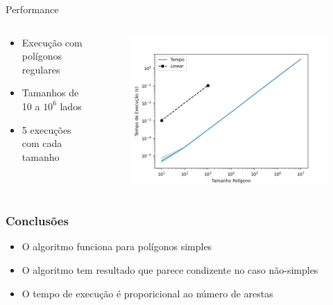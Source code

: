 \documentclass[aspectratio=169]{beamer}
\begin{document}
\begin{frame}{Performance}

  \begin{columns}
    \begin{center}
      \begin{itemize}
        \item Execução com polígonos regulares
        \item Tamanhos de 10 a $10^6$ lados
        \item 5 execuções com cada tamanho
      \end{itemize}
    \end{center}
    \begin{center}   
      \begin{figure}
        \includegraphics[width=1.0\textwidth]{figures/performance.png}
      \end{figure}
    \end{center}
  \end{columns}

\end{frame}

\begin{frame}
\frametitle{Conclusões}

\begin{itemize}
  \item O algoritmo funciona para polígonos simples
  \item O algoritmo tem resultado que parece condizente no caso não-simples
   \item O tempo de execução é proporicional ao número de arestas
\end{itemize}

\end{frame}
\end{document}
